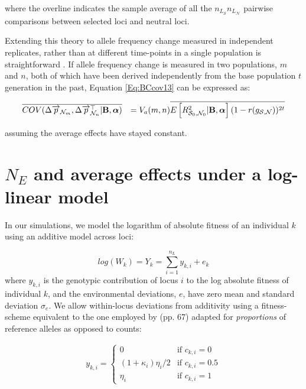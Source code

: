 \documentclass[12pt]{article}
\begin{document}
\begin{bibunit}
where the overline indicates the sample average of all the $n_{L_\mathcal{S}}n_{L_\mathcal{N}}$ pairwise comparisons between selected loci and neutral loci. 

Extending this theory to allele frequency change measured in independent replicates, rather than at different time-points in a single population is straightforward \citep{Buffalo.2020}. If allele frequency change is measured in two populations, $m$ and $n$,  both of which have been derived independently from the base population $t$ generation  in the past, Equation  \ref{Eq:BCcov13} can be expressed as:

\begin{equation}
\begin{array}{rl}
\overline{COV(\Delta \overrightarrow{p}_{{\mathcal N}_m}, \Delta \overrightarrow{p}_{{\mathcal N}_n}^\top | {\bf B}, \boldsymbol{\alpha})}&=
V_a(m,n)\overline{E\left[R_{{\mathcal S}_0,{\mathcal N}_0}^2 | {\bf B}, \boldsymbol{\alpha}\right](1-r(g_{{\mathcal S},{\mathcal N}}))^{2t}}\\
\end{array}
\label{Eq:BCcov14}
\end{equation}

assuming the average effects have stayed constant.


\section{$N_E$ and average effects under a log-linear model}
\label{App:loglinear}

In our simulations, we model the logarithm of absolute fitness of an individual $k$ using an additive model across loci:

$$log(W_k) = Y_k = \sum_{i=1}^{n_L} y_{k,i} + e_k$$
where $y_{k,i}$ is the genotypic contribution of locus $i$ to the log absolute fitness of individual $k$, and the environmental deviations, $e$, have zero mean and standard deviation $\sigma_e$. We allow within-locus deviations from additivity using a fitness-scheme equivalent to the one employed by \citet{lynch1998} (pp. 67) adapted for \emph{proportions} of reference alleles as opposed to counts:

\begin{equation}
\begin{array}{rl}

y_{k,i} =

\begin{cases}
    0 & \text{if } c_{k,i} = 0 \\
    (1 + \kappa_i)\eta_i/2 & \text{if } c_{k,i} = 0.5 \\
    \eta_i & \text{if } c_{k,i} = 1
\end{cases}


\end{array}
\end{equation}
\end{bibunit}
\end{document}
